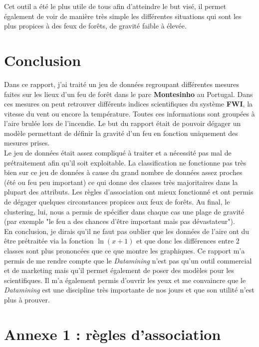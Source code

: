 \documentclass{article}
\begin{document}
\begin{sffamily}
Cet outil a été le plus utile de tous afin d'atteindre le but visé, il permet également de voir de manière très simple les différentes 
situations qui sont les plus propices à des feux de forêts, de gravité faible à élevée.

\section{Conclusion}

Dans ce rapport, j'ai traité un jeu de données regroupant différentes mesures faites sur les lieux d'un feu de forêt dans le parc 
\textbf{Montesinho} au Portugal. Dans ces mesures on peut retrouver différents indices scientifiques du système \textbf{FWI}, la vitesse 
du vent ou encore la température. Toutes ces informations sont groupées à l'aire brulée lors de l'incendie. Le but du rapport était de 
pouvoir dégager un modèle permettant de définir la gravité d'un feu en fonction uniquement des mesures prises. \\

Le jeu de données était assez compliqué à traiter et a nécessité pas mal de prétraitement afin qu'il soit exploitable. La classification 
ne fonctionne pas très bien sur ce jeu de données à cause du grand nombre de données assez proches (été ou feu peu important) ce qui 
donne des classes très majoritaires dans la plupart des attributs. Les règles d'association ont mieux fonctionné et ont permis de dégager 
quelques circonstances propices aux feux de forêts. Au final, le clustering, lui, nous a permis de spécifier dans chaque cas une plage de 
gravité (par exemple "le feu a des chances d'être important mais pas dévastateur"). \\

En conclusion, je dirais qu'il ne faut pas oublier que les données de l'aire ont du être prétraitée via la fonction $\ln{(x+1)}$ et que 
donc les différences entre 2 classes sont plus prononcées que ce que montre les graphiques. Ce rapport m'a permis de me rendre compte que 
le \textit{Datamining} n'est pas qu'un outil commercial et de marketing mais qu'il permet également de poser des modèles pour les 
scientifiques. Il m'a également permis d'ouvrir les yeux et me convaincre que le \textit{Datamining} est une discipline très importante
de nos jours et que son utilité n'est plus à prouver.

\newpage

\appendix

\section{Annexe 1 : règles d'association}


\end{sffamily}
\end{document}
